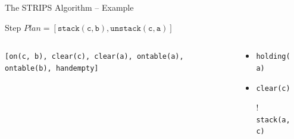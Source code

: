 \documentclass[presentation]{beamer}\mode<presentation>{\usetheme{AMSBolognaFC}}
\begin{document}
\begin{frame}[c]{The STRIPS Algorithm -- Example}
\small

\begin{exampleblock}{Step \nextStripsExampleStep{} \hfill $Plan = [\mathtt{stack(c,b),unstack(c,a)}]$}
	\begin{columns}[t]
		\begin{column}{.30\linewidth}\centering
			\texttt{[on(c, b), clear(c), clear(a), ontable(a), ontable(b), handempty]}
		\end{column}
		\begin{column}{.50\linewidth}\centering
			\begin{itemize}
				\item \texttt{holding(a)}
				\item \texttt{clear(c)}
				\item[!] \texttt{stack(a,c)}
			\end{itemize}
		\end{column}
		\begin{column}{.10\linewidth}\centering
			
		\end{column}
	\end{columns}
\end{exampleblock}

\end{frame}
\end{document}
